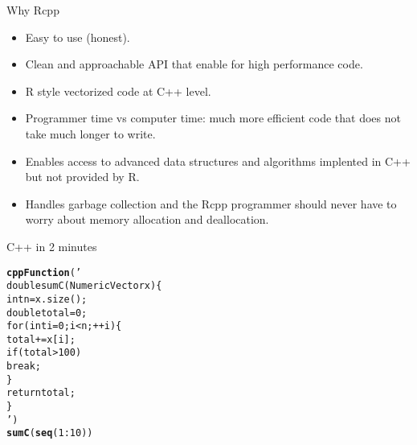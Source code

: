 \documentclass{beamer}\usepackage[]{graphicx}\usepackage[]{color}
\makeatletter
\newcommand{\hlnum}[1]{\textcolor[rgb]{0.686,0.059,0.569}{#1}}%
\newcommand{\hlstr}[1]{\textcolor[rgb]{0.192,0.494,0.8}{#1}}%
\newcommand{\hlopt}[1]{\textcolor[rgb]{0,0,0}{#1}}%
\newcommand{\hlstd}[1]{\textcolor[rgb]{0.345,0.345,0.345}{#1}}%
\newcommand{\hlkwd}[1]{\textcolor[rgb]{0.737,0.353,0.396}{\textbf{#1}}}%
\newenvironment{kframe}{%
 \def\at@end@of@kframe{}%
 \ifinner\ifhmode%
  \def\at@end@of@kframe{\end{minipage}}%
  \begin{minipage}{\columnwidth}%
 \fi\fi%
 \def\FrameCommand##1{\hskip\@totalleftmargin \hskip-\fboxsep
 \colorbox{shadecolor}{##1}\hskip-\fboxsep
     \hskip-\linewidth \hskip-\@totalleftmargin \hskip\columnwidth}%
 \MakeFramed {\advance\hsize-\width
   \@totalleftmargin\z@ \linewidth\hsize
   \@setminipage}}%
 {\par\unskip\endMakeFramed%
 \at@end@of@kframe}
\newenvironment{knitrout}{}{} %
\makeatother
\begin{document}
\begin{frame}[fragile]{Why Rcpp}
    \vspace{1em}
    \begin{itemize}\itemsep1em
        \item Easy to use (honest).
        \item Clean and approachable API that enable for high performance
            code.
        \item R style vectorized code at C++ level.
        \item Programmer time vs computer time: much more efficient code that
            does not take much longer to write.
        \item Enables access to advanced data structures and algorithms
            implented in C++ but not provided by R.
        \item Handles garbage collection and the Rcpp programmer should never
            have to worry about memory allocation and deallocation.
    \end{itemize}
\end{frame}
\begin{frame}[fragile]{C++ in 2 minutes}
\begin{knitrout}\footnotesize
{}\color{fgcolor}\begin{kframe}
\begin{alltt}
\hlkwd{cppFunction}\hlstd{(}\hlstr{'
  double sumC(NumericVector x) \{
    int n = x.size();
    double total = 0;
    for(int i = 0; i < n; ++i) \{
      total += x[i];
    if(total > 100)
    break;
    \}
    return total;
  \}
'}\hlstd{)}
\hlkwd{sumC}\hlstd{(}\hlkwd{seq}\hlstd{(}\hlnum{1}\hlopt{:}\hlnum{10}\hlstd{))}
\end{alltt}
\end{kframe}
\end{knitrout}
\end{frame}
\end{document}
